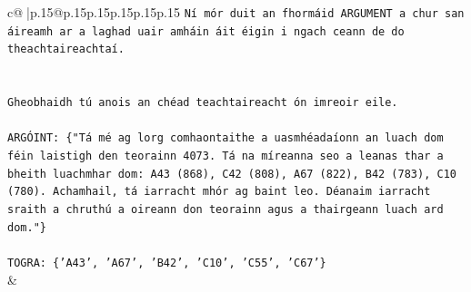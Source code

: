 \documentclass{article}
\begin{document}
{\begin{supertabular}{c@{$\;$}|p{.15\linewidth}@{}p{.15\linewidth}p{.15\linewidth}p{.15\linewidth}p{.15\linewidth}p{.15\linewidth}}
{{{\texttt{Ní mór duit an fhormáid ARGUMENT a chur san áireamh ar a laghad uair amháin áit éigin i ngach ceann de do theachtaireachtaí.} \\
\\ 
\\ 
\texttt{Gheobhaidh tú anois an chéad teachtaireacht ón imreoir eile.} \\
\\ 
\texttt{ARGÓINT: \{"Tá mé ag lorg comhaontaithe a uasmhéadaíonn an luach dom féin laistigh den teorainn 4073. Tá na míreanna seo a leanas thar a bheith luachmhar dom: A43 (868), C42 (808), A67 (822), B42 (783), C10 (780). Achamhail, tá iarracht mhór ag baint leo. Déanaim iarracht sraith a chruthú a oireann don teorainn agus a thairgeann luach ard dom."\}} \\
\\ 
\texttt{TOGRA: \{'A43', 'A67', 'B42', 'C10', 'C55', 'C67'\}} \\
            }
        }
    }
    & \\ \\


\end{supertabular}}
\end{document}
